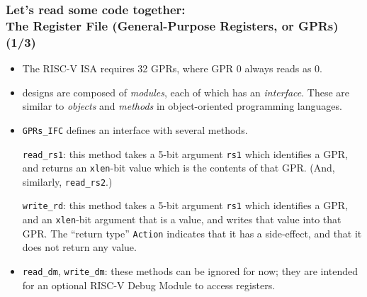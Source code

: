 \begin{frame}[fragile]
\frametitle{Let's read some code together: \\
            The Register File (General-Purpose Registers, or GPRs) (1/3)}

\begin{center}\scriptsize


 \vspace{1ex}

 \begin{minipage}{0.8\textwidth}
  \begin{itemize}

   \item The RISC-V ISA requires 32 GPRs, where GPR 0 always reads as 0.

   \item {\BSV} designs are composed of \emph{modules}, each of which
     has an \emph{interface}.  These are similar to \emph{objects} and
     \emph{methods} in object-oriented programming languages.

   \item {\tt GPRs\_IFC} defines an interface with several methods.

     \vspace*{1ex}

     {\tt read\_rs1}: this method takes a 5-bit argument {\tt rs1}
     which identifies a GPR, and returns an {\tt xlen}-bit value which
     is the contents of that GPR.  (And, similarly, {\tt read\_rs2}.)

     \vspace*{1ex}

     {\tt write\_rd}: this method takes a 5-bit argument {\tt rs1}
     which identifies a GPR, and an {\tt xlen}-bit argument that is a
     value, and writes that value into that GPR.  The ``return type''
     {\tt Action} indicates that it has a side-effect, and that it
     does not return any value.

   \vspace*{2ex}

   \item {\tt read\_dm}, {\tt write\_dm}: these methods can be ignored
     for now; they are intended for an optional RISC-V Debug Module to
     access registers.

  \end{itemize}

 \end{minipage}
\end{center}

\end{frame}

